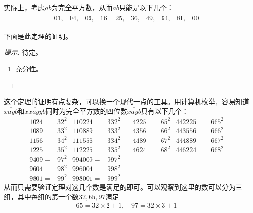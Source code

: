 实际上，考虑$\overline{ab}$为完全平方数，从而$\overline{ab}$只能是以下几个：
\begin{gather*}
  \begin{array}{cccccccccc}
    01,& 04,& 09,& 16,& {25},& {36},& 49,& {64},& {81},& 00
  \end{array}
\end{gather*}

下面是此定理的证明。
\begin{proof}[提示]
  \color{red}待定。

  \begin{enumerate}
  \item 充分性。
  \end{enumerate}
\end{proof}

这个定理的证明有点复杂，可以换一个现代一点的工具。用计算机枚举，容易知道$\overline{xayb}$和$\overline{xxayyb}$同时为完全平方数的四位数$\overline{xayb}$只有以下几个：
\begin{align*}
  1024={}& 32^2 & 110224={}& 332^2& \quad  4225={}& 65^2 & 442225={}& 665^2\\
  1089={}& 33^2 & 110889={}& 333^2& \quad  4356={}& 66^2 & 443556={}& 666^2\\
  1156={}& 34^2 & 111556={}& 334^2& \quad  4489={}& 67^2 & 444889={}& 667^2\\
  1225={}& 35^2 & 112225={}& 335^2& \quad  4624={}& 68^2 & 446224={}& 668^2\\
  9409={}& 97^2 & 994009={}& 997^2\\
  9604={}& 98^2 & 996004={}& 998^2\\
  9801={}& 99^2 & 998001={}& 999^2
\end{align*}
从而只需要验证定理对这几个数是满足的即可。可以观察到这里的数可以分为三组，其中每组的第一个数$32,65,97$满足
\begin{align*}
  65=32\times 2 + 1, \quad 97=32\times 3+1
\end{align*}


